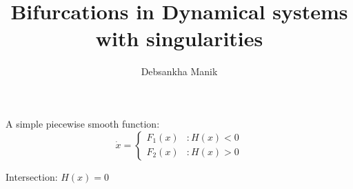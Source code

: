 \documentclass[xcolor=x11names,compress]{beamer}
\renewcommand{\(}{\begin{columns}}
\renewcommand{\)}{\end{columns}}
\newcommand{\<}[1]{\begin{column}{#1}}
\renewcommand{\>}{\end{column}}
\begin{document}
\title{Bifurcations in Dynamical systems with singularities}
\author{Debsankha Manik}


\begin{frame}


\titlepage

\end{frame}


\begin{frame}
A simple piecewise smooth function:
\begin{displaymath}
   \dot{x} = \left\{
     \begin{array}{lr}
       F_1(x) & : H(x) < 0\\
       F_2(x) & : H(x) >0
     \end{array}
   \right.
\end{displaymath}

Intersection: $H(x)=0$

\end{frame}
\end{document}
